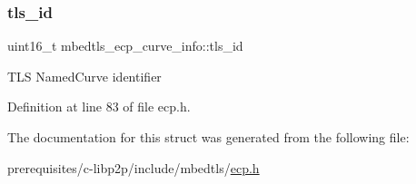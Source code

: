 \subsubsection{\texorpdfstring{tls\+\_\+id}{tls\_id}}
{\footnotesize\ttfamily uint16\+\_\+t mbedtls\+\_\+ecp\+\_\+curve\+\_\+info\+::tls\+\_\+id}

T\+LS Named\+Curve identifier 

Definition at line 83 of file ecp.\+h.



The documentation for this struct was generated from the following file\+:\begin{DoxyCompactItemize}
\item 
prerequisites/c-\/libp2p/include/mbedtls/\mbox{\hyperlink{ecp_8h}{ecp.\+h}}\end{DoxyCompactItemize}
